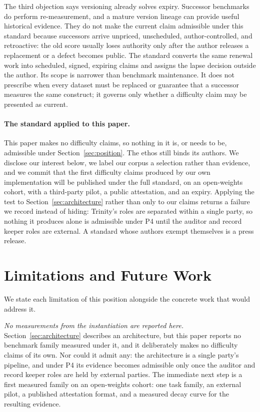 \documentclass[11pt]{article}
\begin{document}
The third objection says versioning already solves expiry. Successor benchmarks do perform re-measurement, and a mature version lineage can provide useful historical evidence. They do not make the current claim admissible under this standard because successors arrive unpriced, unscheduled, author-controlled, and retroactive: the old score usually loses authority only after the author releases a replacement or a defect becomes public. The standard converts the same renewal work into scheduled, signed, expiring claims and assigns the lapse decision outside the author. Its scope is narrower than benchmark maintenance. It does not prescribe when every dataset must be replaced or guarantee that a successor measures the same construct; it governs only whether a difficulty claim may be presented as current.

\paragraph{The standard applied to this paper.}
This paper makes no difficulty claims, so nothing in it is, or needs to be, admissible under Section~\ref{sec:position}. The ethos still binds its authors. We disclose our interest below, we label our corpus a selection rather than evidence, and we commit that the first difficulty claims produced by our own implementation will be published under the full standard, on an open-weights cohort, with a third-party pilot, a public attestation, and an expiry. Applying the test to Section~\ref{sec:architecture} rather than only to our claims returns a failure we record instead of hiding: Trinity's roles are separated within a single party, so nothing it produces alone is admissible under P4 until the auditor and record keeper roles are external. A standard whose authors exempt themselves is a press release.

\section{Limitations and Future Work}
\label{sec:limitations}

We state each limitation of this position alongside the concrete work that would address it.

\emph{No measurements from the instantiation are reported here.} Section~\ref{sec:architecture} describes an architecture, but this paper reports no benchmark family measured under it, and it deliberately makes no difficulty claims of its own. Nor could it admit any: the architecture is a single party's pipeline, and under P4 its evidence becomes admissible only once the auditor and record keeper roles are held by external parties. The immediate next step is a first measured family on an open-weights cohort: one task family, an external pilot, a published attestation format, and a measured decay curve for the resulting evidence.
\end{document}

